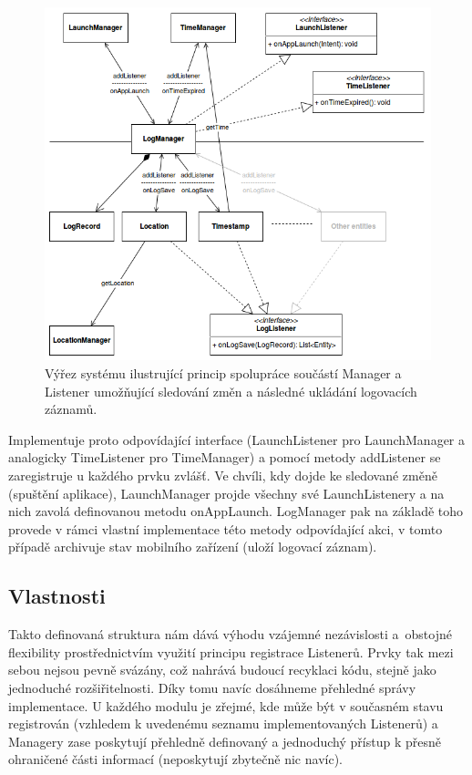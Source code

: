 \documentclass[thesis=M,czech]{FITthesis}[2012/06/26]
\begin{document}
\begin{figure}\centering
	\includegraphics[width=1\textwidth]{figures/manager_listener}
	\caption{Výřez systému ilustrující princip spolupráce součástí Manager a Listener umožňující sledování změn a následné ukládání logovacích záznamů.}
	\label{fig:manager_listener}
\end{figure}

Implementuje proto odpovídající interface (LaunchListener pro LaunchManager a analogicky TimeListener pro TimeManager) a pomocí metody addListener se zaregistruje u každého prvku zvlášť. Ve chvíli, kdy dojde ke sledované změně (spuštění aplikace), LaunchManager projde všechny své LaunchListenery a na nich zavolá definovanou metodu onAppLaunch. LogManager pak na základě toho provede v rámci vlastní implementace této metody odpovídající akci, v tomto případě archivuje stav mobilního zařízení (uloží logovací záznam).

\subsection{Vlastnosti}
Takto definovaná struktura nám dává výhodu vzájemné nezávislosti a~obstojné flexibility prostřednictvím využití principu registrace Listenerů. Prvky tak mezi sebou nejsou pevně svázány, což nahrává budoucí recyklaci kódu, stejně jako jednoduché rozšiřitelnosti. Díky tomu navíc dosáhneme přehledné správy implementace. U každého modulu je zřejmé, kde může být v současném stavu registrován (vzhledem k uvedenému seznamu implementovaných Listenerů) a Managery zase poskytují přehledně definovaný a jednoduchý přístup k přesně ohraničené části informací (neposkytují zbytečně nic navíc).
\end{document}
